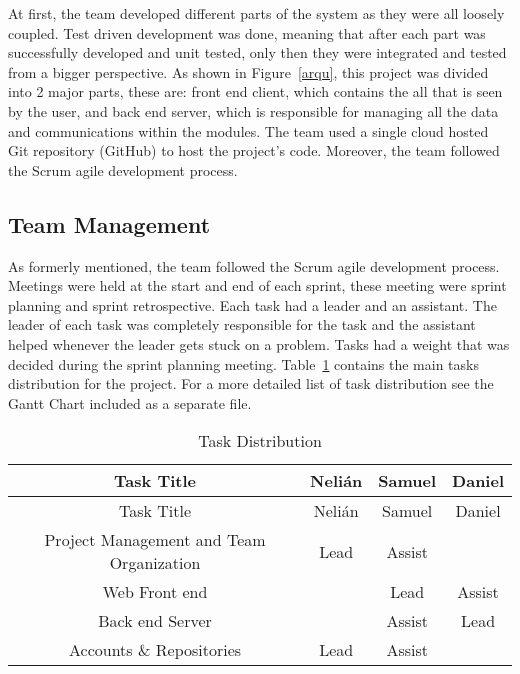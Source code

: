 
At first, the team developed different parts of
the system as they were all loosely coupled. Test driven development was
done, meaning that after each part was successfully developed and unit tested,
only then they were integrated and tested from a bigger perspective. As shown in Figure~\ref{arqu}, this project
was divided into 2 major parts, these are: front end client, which contains the all that is seen by the user, and back end server, which is responsible for managing all the data and communications within the modules. The team used a single cloud hosted Git repository (GitHub) to host the project's
code. Moreover, the
team followed the Scrum agile development process.


\subsection{Team Management}

As formerly mentioned, the team followed the Scrum agile development process.
Meetings were held at the start and end of each sprint, these meeting were
sprint planning and sprint retrospective. Each task had a leader and an
assistant. The leader of each task was completely responsible for the task and
the assistant helped whenever the leader gets stuck on a problem. Tasks had a weight that was decided during the sprint planning
meeting. Table~\ref{tasks} contains the main tasks distribution for the project.
For a more detailed list of task distribution see the Gantt Chart included as a
separate file.

\setlength{\extrarowheight}{1.5pt}
  \begin{longtable}{|c|c|c|c|}
 \caption{Task Distribution \label{tasks}} \\
   \hline
  
  \centering Task Title & Nelián & Samuel & Daniel \\
  \hline \hline \endfirsthead
  
     \hline

	\centering Task Title & Nelián & Samuel & Daniel \\  
	\hline \hline \endhead
  
  \endfoot  
  
  Project Management and Team Organization & Lead & Assist & \\ \hline
  Web Front end & & Lead & Assist \\ \hline
  Back end Server & & Assist & Lead \\ \hline
  Accounts \& Repositories & Lead & Assist &\\ \hline
   \end{longtable}
   
